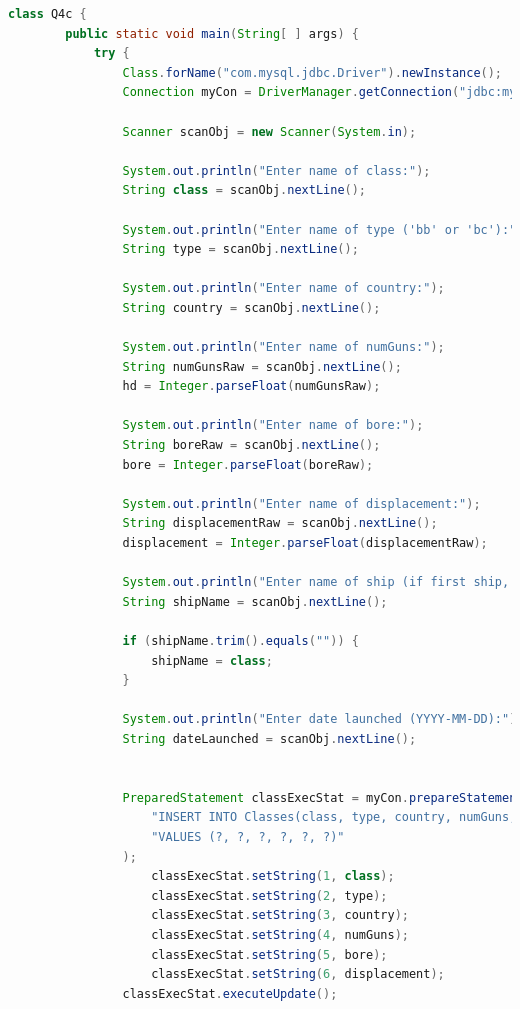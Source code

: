 \documentclass[12pt]{article}
\begin{document}
\begin{enumerate}[1.]
\begin{enumerate}[a)]
\begin{lstlisting}[language=JAVA]
    class Q4c {
        public static void main(String[ ] args) {
            try {
                Class.forName("com.mysql.jdbc.Driver").newInstance();
                Connection myCon = DriverManager.getConnection("jdbc:mysql://localhost/Q4");

                Scanner scanObj = new Scanner(System.in);

                System.out.println("Enter name of class:");
                String class = scanObj.nextLine();

                System.out.println("Enter name of type ('bb' or 'bc'):");
                String type = scanObj.nextLine();

                System.out.println("Enter name of country:");
                String country = scanObj.nextLine();

                System.out.println("Enter name of numGuns:");
                String numGunsRaw = scanObj.nextLine();
                hd = Integer.parseFloat(numGunsRaw);

                System.out.println("Enter name of bore:");
                String boreRaw = scanObj.nextLine();
                bore = Integer.parseFloat(boreRaw);

                System.out.println("Enter name of displacement:");
                String displacementRaw = scanObj.nextLine();
                displacement = Integer.parseFloat(displacementRaw);

                System.out.println("Enter name of ship (if first ship, skip by pressing ENTER):");
                String shipName = scanObj.nextLine();

                if (shipName.trim().equals("")) {
                    shipName = class;
                }

                System.out.println("Enter date launched (YYYY-MM-DD):");
                String dateLaunched = scanObj.nextLine();


                PreparedStatement classExecStat = myCon.prepareStatement(
                    "INSERT INTO Classes(class, type, country, numGuns, bore, displacement) " +
                    "VALUES (?, ?, ?, ?, ?, ?)"
                );
                    classExecStat.setString(1, class);
                    classExecStat.setString(2, type);
                    classExecStat.setString(3, country);
                    classExecStat.setString(4, numGuns);
                    classExecStat.setString(5, bore);
                    classExecStat.setString(6, displacement);
                classExecStat.executeUpdate();


\end{lstlisting}
\end{enumerate}
\end{enumerate}
\end{document}
